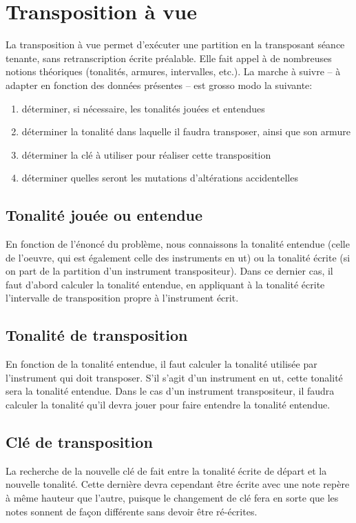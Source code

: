 \documentclass[11pt,a4paper]{scrreprt}
\begin{document}
\section{Transposition à vue}\label{transpovue}
La transposition à vue permet d'exécuter une partition en la transposant séance tenante, sans retranscription écrite préalable. Elle fait appel à de nombreuses notions théoriques (tonalités, armures, intervalles, etc.). La marche à suivre -- à adapter en fonction des données présentes -- est grosso modo la suivante:
\begin{enumerate}
\item déterminer, si nécessaire, les tonalités jouées et entendues
\item déterminer la tonalité dans laquelle il faudra transposer, ainsi que son armure
\item déterminer la clé à utiliser pour réaliser cette transposition
\item déterminer quelles seront les mutations d'altérations accidentelles
\end{enumerate}
\subsection{Tonalité jouée ou entendue}
En fonction de l'énoncé du problème, nous connaissons la tonalité entendue (celle de l'oeuvre, qui est également celle des instruments en ut) ou la tonalité écrite (si on part de la partition d'un instrument transpositeur). Dans ce dernier cas, il faut d'abord calculer la tonalité entendue, en appliquant à la tonalité écrite l'intervalle de transposition propre à l'instrument écrit.

\subsection{Tonalité de transposition}
En fonction de la tonalité entendue, il faut calculer la tonalité utilisée par l'instrument qui doit transposer. S'il s'agit d'un instrument en ut, cette tonalité sera la tonalité entendue. Dans le cas d'un instrument transpositeur, il faudra calculer la tonalité qu'il devra jouer pour faire entendre la tonalité entendue.

\subsection{Clé de transposition}
La recherche de la nouvelle clé de fait entre la tonalité écrite de départ et la nouvelle tonalité. Cette dernière devra cependant être écrite avec une note repère à même hauteur que l'autre, puisque le changement de clé fera en sorte que les notes sonnent de façon différente sans devoir être ré-écrites.
\end{document}
